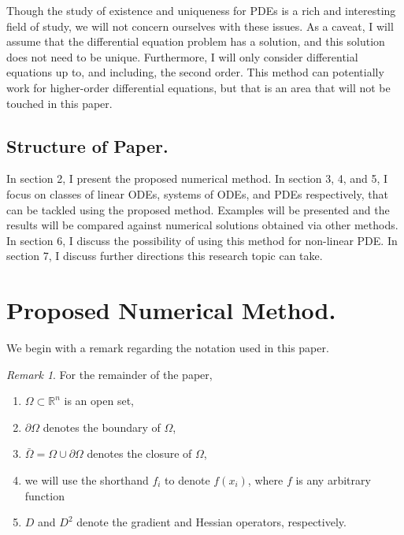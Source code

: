 \documentclass[10pt]{article}
\theoremstyle{plain}
\theoremstyle{definition}
\theoremstyle{remark}
\newtheorem{remark}{Remark}[section]
\numberwithin{theorem}{section}
\numberwithin{proposition}{section}
\numberwithin{remark}{section}
\numberwithin{corollary}{section}
\numberwithin{definition}{section}
\numberwithin{lemma}{section}
\numberwithin{equation}{section}
\begin{document}

Though the study of existence and uniqueness for PDEs is a rich and interesting field of study, we will not concern ourselves with these issues. As a caveat, I will assume that the differential equation problem has a solution, and this solution does not need to be unique. Furthermore, I will only consider differential equations up to, and including, the second order. This method can potentially work for higher-order differential equations, but that is an area that will not be touched in this paper.

\subsection{Structure of Paper.}
In section 2, I present the proposed numerical method. In section 3, 4, and 5, I focus on classes of linear ODEs, systems of ODEs, and PDEs respectively, that can be tackled using the proposed method. Examples will be presented and the results will be compared against numerical solutions obtained via other methods. In section 6, I discuss the possibility of using this method for non-linear PDE. In section 7, I discuss further directions this research topic can take.  

\section{Proposed Numerical Method.}
We begin with a remark regarding the notation used in this paper. 
\begin{remark}
	For the remainder of the paper,
	\begin{enumerate}
		\item $\Omega \subset \mathbb{R}^n$ is an open set,
		\item $\partial \Omega$ denotes the boundary of $\Omega$,
		\item $\bar{\Omega} = \Omega \cup \partial \Omega$ denotes the closure of $\Omega$, 
		\item we will use the shorthand $f_i$ to denote $f(x_i)$, where $f$ is any arbitrary function
		\item $D$ and $D^2$ denote the gradient and Hessian operators, respectively.
	\end{enumerate}
\end{remark}
\end{document}
